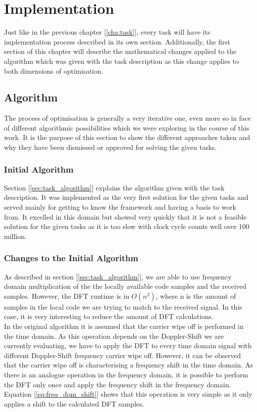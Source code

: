 \usepackage{amsmath}
\usepackage{amssymb}
\chapter{Implementation} %
\label{cha:impl}
	Just like in the previous chapter [\ref{cha:task}], every task will have its implementation process described in its own section.
	Additionally, the first section of this chapter will describe the mathematical changes applied to the algorithm which was given with the task description as this change applies to both dimensions of optimisation. 

	\section{Algorithm} %
	\label{sec:impl_algorithmic_changes}
		The process of optimisation is generally a very iterative one, even more so in face of different algorithmic possibilities which we were exploring in the course of this work. It is the purpose of this section to show the different approaches taken and why they have been dismissed or approved for solving the given tasks.

		\subsection{Initial Algorithm} %
		\label{sub:initial_algorithm}
			Section [\ref{sec:task_algorithm}] explains the algorithm given with the task description. It was implemented as the very first solution for the given tasks and served mainly for getting to know the framework and having a basis to work from. It excelled in this domain but showed very quickly that it is not a feasible solution for the given tasks as it is too slow with clock cycle counts well over \num{100} million. 

		\subsection{Changes to the Initial Algorithm} %
		\label{sub:changes_to_the_initial_algorithm}
			As described in section [\ref{sec:task_algorithm}], we are able to use frequency domain multiplication of the the locally available code samples and the received samples. However, the DFT runtime is in $O(n^2)$, where n is the amount of samples in the local code we are trying to match to the received signal. In this case, it is very interesting to reduce the amount of DFT calculations.\\
			In the original algorithm it is assumed that the carrier wipe off is performed in the time domain. As this operation depends on the Doppler-Shift we are currently evaluating, we have to apply the DFT to every time domain signal with different Doppler-Shift frequency carrier wipe off. However, it can be observed that the carrier wipe off is characterising a frequency shift in the time domain. As there is an analogue operation in the frequency domain, it is possible to perform the DFT only once and apply the frequency shift in the frequency domain. Equation [\ref{eq:freq_dom_shift}] shows that this operation is very simple as it only applies a shift to the calculated DFT samples.

